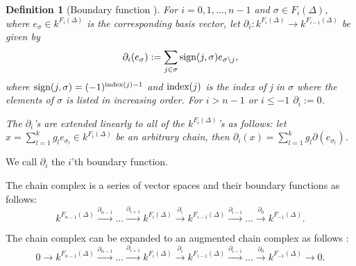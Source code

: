 \documentclass[11pt,a4paper,twoside]{report}
\newtheorem{mydef}[mythm]{Definition}
\begin{document}
\begin{mydef}[Boundary function \cite{Allgaier}]\label{def:boundary}
For $i=0,1,\dots,n-1$ and $\sigma\in F_i(\Delta)$, where $e_\sigma\in k^{F_i(\Delta)}$ is the corresponding basis vector, let $\partial_i: k^{F_i(\Delta)} \to k^{F_{i-1}(\Delta)}$ be given by 
\begin{equation*}
\partial_i(e_\sigma):=\sum_{j\in\sigma}\textnormal{sign}(j,\sigma)e_{\sigma\setminus j} ,
\end{equation*}
where $\textnormal{sign}(j,\sigma) = (-1)^{\textnormal{index}(j)-1}$ and $\textnormal{index}(j)$ is the index of j in $\sigma$ where the elements of $\sigma$ is listed in increasing order. For $i>n-1$ or $i\leq-1$ $\partial_i:=0$. 

The $\partial_i$'s are extended linearly to all of the $k^{F_i(\Delta)}$'s as follows: let $x = \sum_{l=1}^kg_le_{\sigma_l}\in k^{F_i(\Delta)}$ be an arbitrary chain, then $\partial_i(x)=\sum_{l=1}^kg_l\partial (e_{\sigma_l})$.
\end{mydef}
We call $\partial_i$ the $i$'th boundary function.

The chain complex is a series of vector spaces and their boundary functions as follows:
\begin{equation*}
k^{F_{n-1}(\Delta)}\overset{\partial_{n-1}}{\to}\dots\overset{\partial_{i+1}}{\to} k^{F_{i}(\Delta)}\overset{\partial_{i}}{\to}k^{F_{i-1}(\Delta)}\overset{\partial_{i-1}}{\to}\dots\overset{\partial_{0}}{\to} k^{F_{-1}(\Delta)}.
\end{equation*}

The chain complex can be expanded to an augmented chain complex as follows \cite{Allgaier}:
\begin{equation*}
0\to k^{F_{n-1}(\Delta)}\overset{\partial_{n-1}}{\to}\dots\overset{\partial_{i+1}}{\to} k^{F_{i}(\Delta)}\overset{\partial_{i}}{\to}k^{F_{i-1}(\Delta)}\overset{\partial_{i-1}}{\to}\dots\overset{\partial_{0}}{\to} k^{F_{-1}(\Delta)}\to 0.
\end{equation*}
\end{document}
